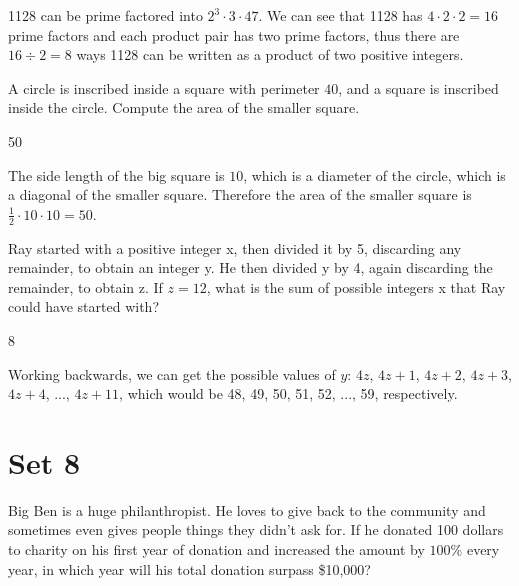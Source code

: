 \documentclass[11pt]{article}
\begin{document}
\begin{solution}
1128 can be prime factored into $2^3 \cdot 3 \cdot 47$. We can see that 1128 has $4 \cdot 2 \cdot 2 = 16$ prime factors and each product pair has two prime factors, thus there are $16 \div 2 = 8$ ways 1128 can be written as a product of two positive integers.   
\end{solution}

\begin{problem} 
A circle is inscribed inside a square with perimeter $40$, and a square is inscribed inside the circle. Compute the area of the smaller square. 
\end{problem}

\begin{answer}
50
\end{answer}

\begin{solution}
The side length of the big square is $10$, which is a diameter of the circle, which is a diagonal of the smaller square. Therefore the area of the smaller square is $\frac{1}{2} \cdot 10 \cdot 10 = 50$.
\end{solution}

\begin{problem} 
Ray started with a positive integer x, then divided it by 5, discarding any remainder, to obtain an integer y. He then divided y by 4, again discarding the remainder, to obtain z. If $z = 12$, what is the sum of possible integers x that Ray could have started with?
\end{problem}

\begin{answer}
8
\end{answer}

\begin{solution}
Working backwards, we can get the possible values of $y$: $4z$, $4z+1$, $4z+2$, $4z+3$, $4z+4$, ..., $4z+11$, which would be 48, 49, 50, 51, 52, ..., 59, respectively.
\end{solution}

\newpage

\section*{Set 8}

\begin{problem} 
Big Ben is a huge philanthropist. He loves to give back to the community and sometimes even gives people things they didn't ask for. If he donated 100 dollars to charity on his first year of donation and increased the amount by $100\%$ every year, in which year will his total donation surpass \$10,000? 
\end{problem}
\end{document}
